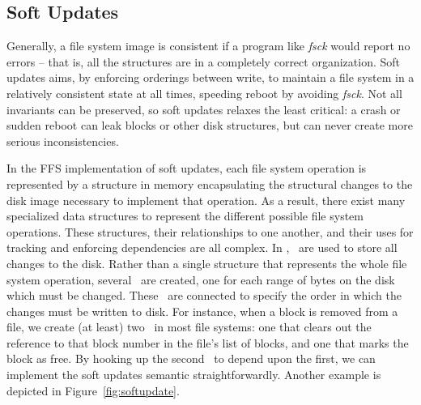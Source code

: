 \subsection {Soft Updates}
\label{sec:consistency:softupdate}

Generally, a file system image is consistent if a program like \emph{fsck}
would report no errors -- that is, all the structures are in a completely
correct organization.  
%
Soft updates aims, by enforcing orderings between write, to maintain a file
system in a relatively consistent state at all times, speeding reboot by
avoiding \emph{fsck}.
%
Not all invariants can be preserved, so soft updates relaxes the least
critical: a crash or sudden reboot can leak blocks or other disk
structures, but can never create more serious inconsistencies.
%
%

In the FFS implementation of soft updates, each file system operation
is represented by a structure in memory  encapsulating the
structural changes to the disk image necessary to implement that operation. As
a result, there exist many specialized data structures to represent the
different possible file system operations. 
These structures, their relationships to one another,
and their uses for tracking and enforcing dependencies are all complex.
%
In \Kudos, \chdescs\ are used to store all changes to the disk.  Rather than
a single structure that represents the whole file system operation, several
\chdescs\ are created, one for each range of bytes on the disk which must be
changed. These \chdescs\ are connected to specify the
order in which the changes must be written to disk. For instance, when a block is
removed from a file, we create (at least) two \chdescs\ in most file systems:
one that clears out the reference to that block number in the file's list of
blocks, and one that marks the block as free. By hooking up the second \chdesc\
to depend upon the first, we can implement the soft updates semantic
straightforwardly. Another example is depicted in Figure~\ref{fig:softupdate}.

